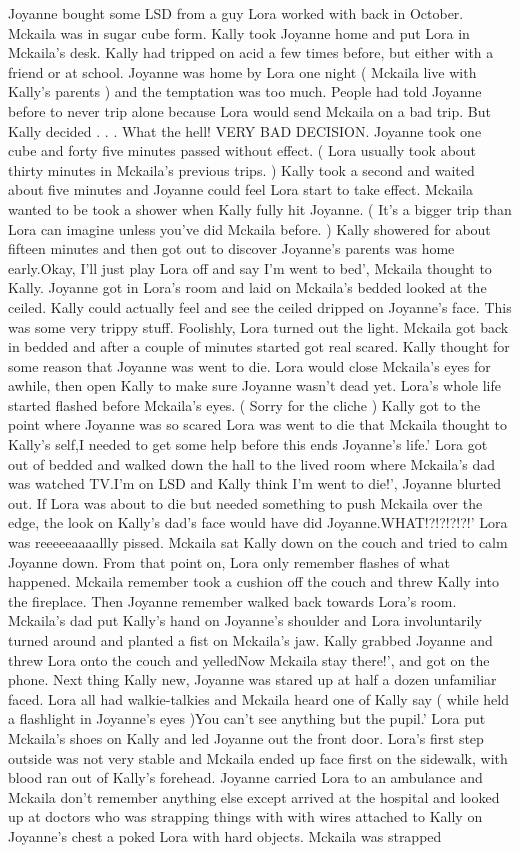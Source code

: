 \documentclass[12pt]{book}
\begin{document}
Joyanne bought some LSD from a guy Lora worked with back in October. Mckaila was in sugar cube form. Kally took Joyanne home and put Lora in Mckaila's desk. Kally had tripped on acid a few times before, but either with a friend or at school. Joyanne was home by Lora one night ( Mckaila live with Kally's parents ) and the temptation was too much. People had told Joyanne before to never trip alone because Lora would send Mckaila on a bad trip. But Kally decided . . .  What the hell! VERY BAD DECISION. Joyanne took one cube and forty five minutes passed without effect. ( Lora usually took about thirty minutes in Mckaila's previous trips. ) Kally took a second and waited about five minutes and Joyanne could feel Lora start to take effect. Mckaila wanted to be took a shower when Kally fully hit Joyanne. ( It's a bigger trip than Lora can imagine unless you've did Mckaila before. ) Kally showered for about fifteen minutes and then got out to discover Joyanne's parents was home early.Okay, I'll just play Lora off and say I'm went to bed', Mckaila thought to Kally. Joyanne got in Lora's room and laid on Mckaila's bedded looked at the ceiled. Kally could actually feel and see the ceiled dripped on Joyanne's face. This was some very trippy stuff. Foolishly, Lora turned out the light. Mckaila got back in bedded and after a couple of minutes started got real scared. Kally thought for some reason that Joyanne was went to die. Lora would close Mckaila's eyes for awhile, then open Kally to make sure Joyanne wasn't dead yet. Lora's whole life started flashed before Mckaila's eyes. ( Sorry for the cliche ) Kally got to the point where Joyanne was so scared Lora was went to die that Mckaila thought to Kally's self,I needed to get some help before this ends Joyanne's life.' Lora got out of bedded and walked down the hall to the lived room where Mckaila's dad was watched TV.I'm on LSD and Kally think I'm went to die!', Joyanne blurted out. If Lora was about to die but needed something to push Mckaila over the edge, the look on Kally's dad's face would have did Joyanne.WHAT!?!?!?!?!' Lora was reeeeeaaaallly pissed. Mckaila sat Kally down on the couch and tried to calm Joyanne down. From that point on, Lora only remember flashes of what happened. Mckaila remember took a cushion off the couch and threw Kally into the fireplace. Then Joyanne remember walked back towards Lora's room. Mckaila's dad put Kally's hand on Joyanne's shoulder and Lora involuntarily turned around and planted a fist on Mckaila's jaw. Kally grabbed Joyanne and threw Lora onto the couch and yelledNow Mckaila stay there!', and got on the phone. Next thing Kally new, Joyanne was stared up at half a dozen unfamiliar faced. Lora all had walkie-talkies and Mckaila heard one of Kally say ( while held a flashlight in Joyanne's eyes )You can't see anything but the pupil.' Lora put Mckaila's shoes on Kally and led Joyanne out the front door. Lora's first step outside was not very stable and Mckaila ended up face first on the sidewalk, with blood ran out of Kally's forehead. Joyanne carried Lora to an ambulance and Mckaila don't remember anything else except arrived at the hospital and looked up at doctors who was strapping things with with wires attached to Kally on Joyanne's chest a poked Lora with hard objects. Mckaila was strapped 
\end{document}
